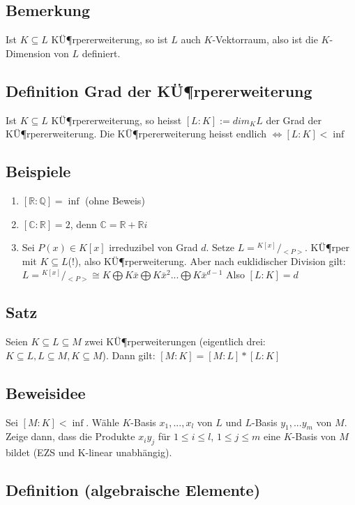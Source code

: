 \documentclass[12pt,a4paper,ngerman]{scrreprt}
\newcommand{\modulus}[2]{{}^{#1} \!/\!_{#2}}
\begin{document}
\subsection{Bemerkung}
Ist $K \subseteq L$ KÜ¶rpererweiterung, so ist $L$ auch $K$-Vektorraum, 
also ist die $K$-Dimension von $L$ definiert. 

\subsection{Definition Grad der KÜ¶rpererweiterung}

Ist $K \subseteq L$ KÜ¶rpererweiterung, so heisst $[L:K] := dim_KL$ der Grad der KÜ¶rpererweiterung.
Die KÜ¶rpererweiterung heisst endlich $\Leftrightarrow [L:K] < \inf$

\subsection{Beispiele}
\begin{enumerate}[]
\item $[\mathbb{R}:\mathbb{Q}] = \inf$ (ohne Beweis)
\item $[\mathbb{C}:\mathbb{R}] = 2$, denn $\mathbb{C} = \mathbb{R} + \mathbb{R}i$
\item Sei $P(x) \in K[x]$ irreduzibel von Grad $d$. 
Setze $L = \modulus{K[x]}{<P>}$. KÜ¶rper mit $K \subseteq L$(!), also KÜ¶rperweiterung. 
Aber nach euklidischer Division gilt: 
$L = \modulus{K[x]}{<P>} \cong K \bigoplus K\bar{x} \bigoplus K\bar{x}^2 ... \bigoplus K\bar{x}^{d-1}$
Also $[L:K] = d$
\end{enumerate}

\subsection{Satz}
Seien $K \subseteq L \subseteq M$ zwei KÜ¶rperweiterungen (eigentlich drei: $K \subseteq L, L \subseteq M, K \subseteq M$).
Dann gilt: $[M:K] = [M:L] * [L:K]$

\subsection{Beweisidee}

Sei $[M:K] < \inf$. Wähle $K$-Basis $x_1, ..., x_l$ von $L$ und $L$-Basis $y_1, ... y_m$ von $M$.
Zeige dann, dass die Produkte $x_iy_j$ für $1 \leq i \leq l$, $1 \leq j \leq m$ 
eine $K$-Basis von $M$ bildet (EZS und K-linear unabhängig).

\subsection{Definition (algebraische Elemente)}
\end{document}
